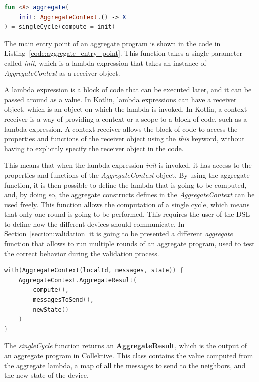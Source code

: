\begin{lstlisting}[caption={Aggregate entry point}, captionpos=b, language=Kotlin, label={code:aggregate_entry_point}]
fun <X> aggregate(
    init: AggregateContext.() -> X
) = singleCycle(compute = init)
\end{lstlisting}
The main entry point of an aggregate program is shown in the code in Listing~\ref{code:aggregate_entry_point}.\newline
This function takes a single parameter called \textit{init}, which is a lambda expression that takes an instance of \textit{AggregateContext} as a receiver object.

\begin{info}
    A lambda expression is a block of code that can be executed later, and it can be passed around as a value. In Kotlin, lambda expressions can have a receiver object, which is an object on which the lambda is invoked.\newline
    In Kotlin, a context receiver is a way of providing a context or a scope to a block of code, such as a lambda expression. A context receiver allows the block of code to access the properties and functions of the receiver object using the \textit{this} keyword, without having to explicitly specify the receiver object in the code.
\end{info}

This means that when the lambda expression \textit{init} is invoked, it has access to the properties and functions of the \textit{AggregateContext} object. By using the aggregate function, it is then possible to define the lambda that is going to be computed, and, by doing so, the aggregate constructs defines in the \textit{AggregateContext} can be used freely.\newline
This function allows the computation of a single cycle, which means that only one round is going to be performed. This requires the user of the DSL to define how the different devices should communicate. In Section~\ref{section:validation} it is going to be presented a different \textit{aggregate} function that allows to run multiple rounds of an aggregate program, used to test the correct behavior during the validation process.
\begin{lstlisting}[caption={Single cycle \textit{AggregateResult} output}, captionpos=b, language=Kotlin, label={code:single_cycle_return_type}]
with(AggregateContext(localId, messages, state)) {
    AggregateContext.AggregateResult(
        compute(),
        messagesToSend(),
        newState()
    )
}
\end{lstlisting}
The \textit{singleCycle} function returns an \textbf{AggregateResult}, which is the output of an aggregate program in Collektive. This class contains the value computed from the aggregate lambda, a map of all the messages to send to the neighbors, and the new state of the device.

